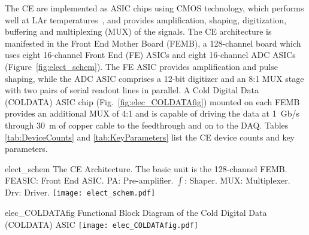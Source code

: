 The CE are implemented as ASIC chips using CMOS technology,
which performs well at LAr temperatures~\cite{ThornEtAl:CELAr},
and provides amplification, shaping, digitization, buffering and multiplexing (MUX) of the signals.
The CE architecture is manifested in the Front End Mother Board (FEMB),
a 128-channel board which uses eight 16-channel Front End (FE) ASICs and eight 16-channel ADC ASICs
(Figure~\ref{fig:elect_schem}).
The FE ASIC provides amplification and pulse shaping, while
the ADC ASIC comprises a 12-bit digitizer
and an 8:1 MUX stage with two pairs of serial readout lines in parallel.
A Cold Digital Data (COLDATA) ASIC chip (Fig.~\ref{fig:elec_COLDATAfig}) mounted on each FEMB provides an additional MUX of 4:1 and
is capable of driving the data at 1~Gb/s through 30~m of copper cable to the feedthrough and on to the DAQ. 
Tables \ref{tab:DeviceCounts} and \ref{tab:KeyParameters} list the CE device counts and key parameters.
\begin{cdrfigure}{elect_schem}
{
  The CE Architecture. The basic unit is the 128-channel FEMB. FEASIC: Front End ASIC.
  PA: Pre-amplifier.  $\int$: Shaper.  MUX: Multiplexer.  Drv: Driver.
}
\texttt{[image: elect\_schem.pdf]}
\end{cdrfigure}
\begin{cdrfigure}{elec_COLDATAfig}
{Functional Block Diagram of the Cold Digital Data (COLDATA) ASIC}
\texttt{[image: elec\_COLDATAfig.pdf]}
\end{cdrfigure}

